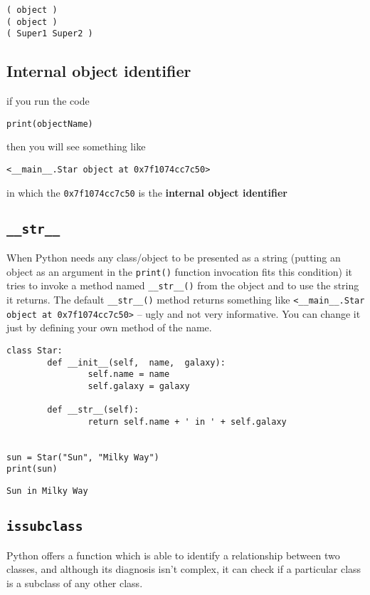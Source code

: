 \documentclass[11pt]{article}
\begin{document}
\begin{verbatim}
( object )
( object )
( Super1 Super2 )
\end{verbatim}
\subsection{Internal object identifier}
\label{sec:orgc5cddcd}
if you run the code 

\texttt{print(objectName)}

then you will see something like

\texttt{<\_\_main\_\_.Star object at 0x7f1074cc7c50>}

in which the \texttt{0x7f1074cc7c50} is the \textbf{internal object identifier}

\subsection{\texttt{\_\_str\_\_}}
\label{sec:org98dff22}
When Python needs any class/object to be presented as a string
(putting an object as an argument in the \texttt{print()} function invocation
fits this condition) it tries to invoke a method named \texttt{\_\_str\_\_()}
from the object and to use the string it returns. The default
\texttt{\_\_str\_\_()} method returns something like \texttt{<\_\_main\_\_.Star object at
0x7f1074cc7c50>} – ugly and not very informative. You can change it
just by defining your own method of the name.

\begin{verbatim}
class Star:
        def __init__(self,  name,  galaxy):
                self.name = name
                self.galaxy = galaxy

        def __str__(self):
                return self.name + ' in ' + self.galaxy


sun = Star("Sun", "Milky Way")
print(sun)

\end{verbatim}

\begin{verbatim}
Sun in Milky Way
\end{verbatim}
\newpage

\subsection{\texttt{issubclass}}
\label{sec:org5e8575b}
Python offers a function which is able to identify a relationship
between two classes, and although its diagnosis isn’t complex, it can
check if a particular class is a subclass of any other class.
\end{document}
